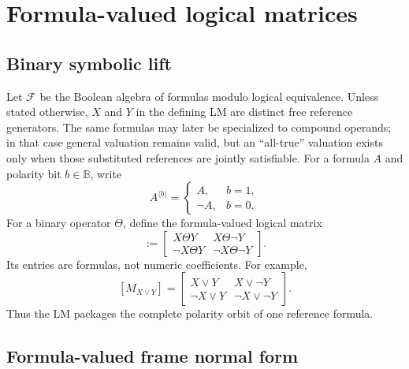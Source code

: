\documentclass[11pt]{article}
\theoremstyle{definition}
\theoremstyle{remark}
\newcommand{\B}{\mathbb B}
\newcommand{\cF}{\mathcal F}
\begin{document}
\section{Formula-valued logical matrices}
\label{sec:lm}

\subsection{Binary symbolic lift}

Let $\cF$ be the Boolean algebra of formulas modulo logical equivalence.  Unless stated otherwise, $X$ and $Y$ in the defining LM are distinct free reference generators.  The same formulas may later be specialized to compound operands; in that case general valuation remains valid, but an ``all-true'' valuation exists only when those substituted references are jointly satisfiable.  For a formula $A$ and polarity bit $b\in\B$, write
\begin{equation}
 A^{\langle b\rangle}=\begin{cases}A,&b=1,\\\neg A,&b=0.\end{cases}
 \label{eq:polarity}
\end{equation}
For a binary operator $\Theta$, define the formula-valued logical matrix
\begin{equation}
 [M_{X\Theta Y}]:=
 \begin{bmatrix}
 X\Theta Y&X\Theta\neg Y\\
 \neg X\Theta Y&\neg X\Theta\neg Y
 \end{bmatrix}.
 \label{eq:binarylm}
\end{equation}
Its entries are formulas, not numeric coefficients.  For example,
\[
 [M_{X\lor Y}]=
 \begin{bmatrix}
 X\lor Y&X\lor\neg Y\\
 \neg X\lor Y&\neg X\lor\neg Y
 \end{bmatrix}.
\]
Thus the LM packages the complete polarity orbit of one reference formula.

\subsection{Formula-valued frame normal form}
\end{document}
